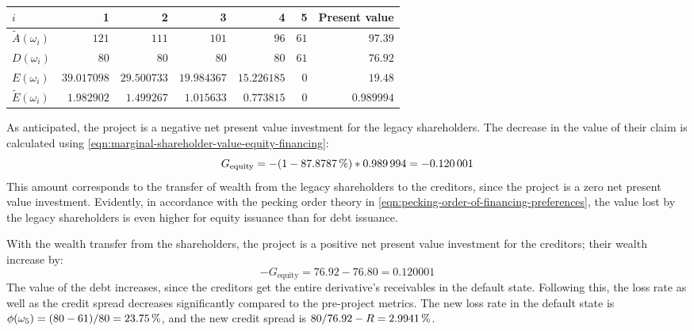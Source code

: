\documentclass[main.tex]{subfiles}
\begin{document}
        \begin{table}[H]
            \centering\begin{tabular}{l|rrrrr||r}
                $i$ & 1 & 2 & 3 & 4 & 5 & Present value \\
                \hline
                \rule{0pt}{1.1em}
                $\tilde{A}(\omega_{i})$ & $\num{121}$ & $\num{111}$ & $\num{101}$ & $\num{96}$ & $\num{61}$ & $\num{97.39}$ \\
                $D(\omega_{i})$ & $\num{80}$ & $\num{80}$ & $\num{80}$ & $\num{80}$ & $\num{61}$ & $\num{76.92}$ \\
                $E(\omega_{i})$ & $\num{39.017098}$ & $\num{29.500733}$ & $\num{19.984367}$ & $\num{15.226185}$ & $\num{0}$ & $\num{19.48}$ \\
                $\tilde{E}(\omega_{i})$ & $\num{1.982902}$ & $\num{1.499267}$ & $\num{1.015633}$ & $\num{0.773815}$ & $\num{0}$ & $\num{0.989994}$ \\
            \end{tabular}
            \caption{}
            \label{tbl:equity-funding-payoff}
        \end{table}

        As anticipated,
        the project is a negative net present value investment for the legacy shareholders. 
        The decrease in the value of their claim is calculated using
        \cref{eqn:marginal-shareholder-value-equity-financing}:
        \begin{equation*}
                G_{\text{equity}}
            =
                - (\num{1} - \pct{0.878787}) * \num{0.989994}
            = 
                -\num{0.120001}
        \end{equation*}
        This amount corresponds to the transfer of wealth 
        from the legacy shareholders to the creditors,
        since the project is a zero net present value investment.
        Evidently, in accordance with the pecking order theory in 
        \cref{eqn:pecking-order-of-financing-preferences},
        the value lost by the legacy shareholders 
        is even higher for equity issuance than for debt issuance.

        With the wealth transfer from the shareholders,
        the project is a positive net present value investment for the creditors;
        their wealth increase by:
        \begin{equation*}\label{eqn:wealth-transfer-equality}
            -G_{\text{equity}} = \num{76.92} - \num{76.80} = \num{0.120001}
        \end{equation*}
        The value of the debt increases, 
        since the creditors get the entire derivative's receivables in the default state. 
        Following this, the loss rate as well as the credit spread decreases significantly 
        compared to the pre-project metrics. 
        The new loss rate in the default state is 
        $\phi(\omega_{5}) = (\num{80}-\num{61})/\num{80} = \pct{0.2375}$, 
        and the new credit spread is $\num{80}/\num{76.92} - \grossrfrate = \pct{0.029941}$.
\end{document}
